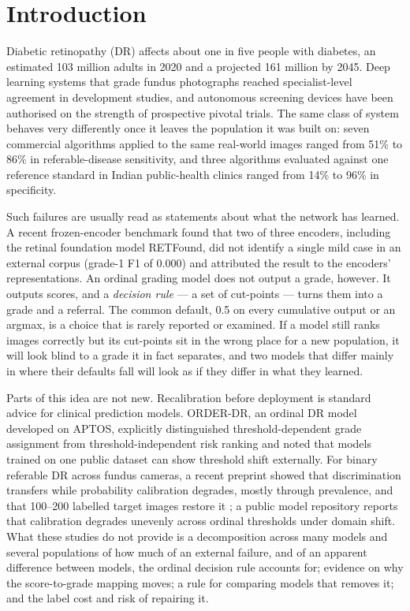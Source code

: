 \section{Introduction}\label{sec:intro}

Diabetic retinopathy (DR) affects about one in five people with diabetes, an estimated
103 million adults in 2020 and a projected 161 million by 2045\cite{teo2021prevalence}.
Deep learning systems that grade fundus photographs reached specialist-level agreement in
development studies\cite{gulshan2016,ting2017}, and autonomous screening devices have been
authorised on the strength of prospective pivotal trials\cite{abramoff2018pivotal,ipp2021eyeart}.
The same class of system behaves very differently once it leaves the population it was built
on: seven commercial algorithms applied to the same real-world images ranged from 51\% to 86\%
in referable-disease sensitivity\cite{lee2021headtohead}, and three algorithms evaluated against
one reference standard in Indian public-health clinics ranged from 14\% to 96\% in
specificity\cite{duggal2025realworld}.

Such failures are usually read as statements about what the network has learned. A recent
frozen-encoder benchmark found that two of three encoders, including the retinal foundation
model RETFound, did not identify a single mild case in an external corpus (grade-1 F1 of 0.000)
and attributed the result to the encoders' representations\cite{poyrazer2026calibration}.
An ordinal grading model does not output a grade, however. It outputs scores, and a
\emph{decision rule} --- a set of cut-points --- turns them into a grade and a referral. The
common default, 0.5 on every cumulative output or an argmax, is a choice that is rarely
reported or examined. If a model still ranks images correctly but its cut-points sit in the
wrong place for a new population, it will look blind to a grade it in fact separates, and two
models that differ mainly in where their defaults fall will look as if they differ in what they
learned.

Parts of this idea are not new. Recalibration before deployment is standard advice for
clinical prediction models\cite{janssen2008updating,vergouwe2017updating}. ORDER-DR, an ordinal
DR model developed on APTOS, explicitly distinguished threshold-dependent grade assignment from
threshold-independent risk ranking and noted that models trained on one public dataset can show
threshold shift externally\cite{sheng2026orderdr}. For binary referable DR across fundus
cameras, a recent preprint showed that discrimination transfers while probability calibration
degrades, mostly through prevalence, and that 100--200 labelled target images restore it
\cite{tabibu2026discrimination}; a public model repository reports that calibration degrades
unevenly across ordinal thresholds under domain shift\cite{gradeye2026}. What these studies do not
provide is a decomposition across many models and several populations of how much of an external
failure, and of an apparent difference between models, the ordinal decision rule accounts for;
evidence on why the score-to-grade mapping moves; a rule for comparing models that removes it;
and the label cost and risk of repairing it.

